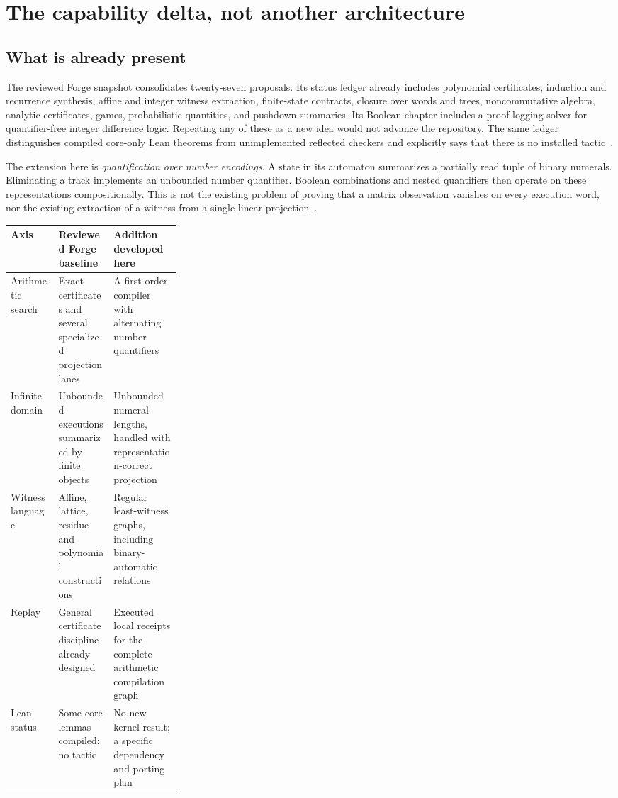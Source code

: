 \section{The capability delta, not another architecture}\label{sec:delta}

\subsection{What is already present}
The reviewed Forge snapshot consolidates twenty-seven proposals. Its status ledger already includes polynomial certificates, induction and recurrence synthesis, affine and integer witness extraction, finite-state contracts, closure over words and trees, noncommutative algebra, analytic certificates, games, probabilistic quantities, and pushdown summaries. Its Boolean chapter includes a proof-logging solver for quantifier-free integer difference logic. Repeating any of these as a new idea would not advance the repository. The same ledger distinguishes compiled core-only Lean theorems from unimplemented reflected checkers and explicitly says that there is no installed  tactic~\cite{forge-status,forge-readme,forge-boolean}.

The extension here is \emph{quantification over number encodings}. A state in its automaton summarizes a partially read tuple of binary numerals. Eliminating a track implements an unbounded number quantifier. Boolean combinations and nested quantifiers then operate on these representations compositionally. This is not the existing problem of proving that a matrix observation vanishes on every execution word, nor the existing extraction of a witness from a single linear projection~\cite{forge-closure}.

\begin{center}
\begin{tabularx}{\linewidth}{@{}p{0.28\linewidth}XX@{}}
\toprule
Axis & Reviewed Forge baseline & Addition developed here\\
\midrule
Arithmetic search & Exact certificates and several specialized projection lanes & A first-order compiler with alternating number quantifiers\\
Infinite domain & Unbounded executions summarized by finite objects & Unbounded numeral lengths, handled with representation-correct projection\\
Witness language & Affine, lattice, residue and polynomial constructions & Regular least-witness graphs, including binary-automatic relations\\
Replay & General certificate discipline already designed & Executed local receipts for the complete arithmetic compilation graph\\
Lean status & Some core lemmas compiled; no tactic & No new kernel result; a specific dependency and porting plan\\
\bottomrule
\end{tabularx}
\end{center}

